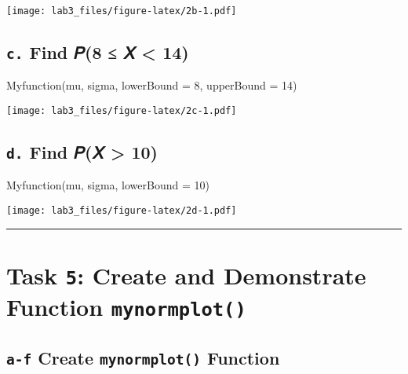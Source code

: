 \documentclass[
  12pt,
]{article}
\newenvironment{Shaded}{\begin{snugshade}}{\end{snugshade}}
\newcommand{\AttributeTok}[1]{\textcolor[rgb]{0.77,0.63,0.00}{#1}}
\newcommand{\DecValTok}[1]{\textcolor[rgb]{0.00,0.00,0.81}{#1}}
\newcommand{\FunctionTok}[1]{\textcolor[rgb]{0.00,0.00,0.00}{#1}}
\newcommand{\NormalTok}[1]{#1}
\begin{document}
\texttt{[image: lab3\_files/figure-latex/2b-1.pdf]}

\hypertarget{c.-find-ux1d4438-ux1d44b-14-1}{%
\subsection{\texorpdfstring{\texttt{c.} Find 𝑃(8 ≤ 𝑋 \textless{}
14)}{c. Find 𝑃(8 ≤ 𝑋 \textless{} 14)}}\label{c.-find-ux1d4438-ux1d44b-14-1}}

\begin{Shaded}
\begin{Highlighting}[]
\FunctionTok{Myfunction}\NormalTok{(mu, sigma, }\AttributeTok{lowerBound =} \DecValTok{8}\NormalTok{, }\AttributeTok{upperBound =} \DecValTok{14}\NormalTok{)}
\end{Highlighting}
\end{Shaded}

\texttt{[image: lab3\_files/figure-latex/2c-1.pdf]}

\hypertarget{d.-find-ux1d443ux1d44b-10-1}{%
\subsection{\texorpdfstring{\texttt{d.} Find 𝑃(𝑋 \textgreater{}
10)}{d. Find 𝑃(𝑋 \textgreater{} 10)}}\label{d.-find-ux1d443ux1d44b-10-1}}

\begin{Shaded}
\begin{Highlighting}[]
\FunctionTok{Myfunction}\NormalTok{(mu, sigma, }\AttributeTok{lowerBound =} \DecValTok{10}\NormalTok{)}
\end{Highlighting}
\end{Shaded}

\texttt{[image: lab3\_files/figure-latex/2d-1.pdf]}

\begin{center}\rule{0.5\linewidth}{0.5pt}\end{center}

\hypertarget{task-5-create-and-demonstrate-function-mynormplot}{%
\section{\texorpdfstring{Task \texttt{5}: Create and Demonstrate
Function
\texttt{mynormplot()}}{Task 5: Create and Demonstrate Function mynormplot()}}\label{task-5-create-and-demonstrate-function-mynormplot}}

\hypertarget{a-f-create-mynormplot-function}{%
\subsection{\texorpdfstring{\texttt{a-f} Create \texttt{mynormplot()}
Function}{a-f Create mynormplot() Function}}\label{a-f-create-mynormplot-function}}
\end{document}
